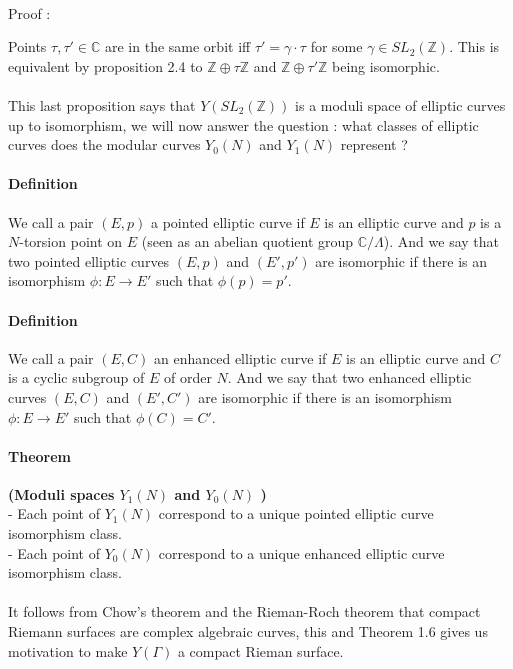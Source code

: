 \documentclass[letterpaper,10pt]{article}
\begin{document}
{\itshape \paragraph{}Proof : } Points $\tau, \tau' \in \mathbb{C}$ are in the same orbit iff $\tau' = \gamma \cdot \tau$ for some $\gamma \in SL_2(\mathbb{Z})$.
This is equivalent by proposition  2.4 to $\mathbb{Z} \oplus \tau\mathbb{Z}$ and $\mathbb{Z} \oplus \tau'\mathbb{Z}$ being isomorphic.



{\itshape \paragraph{} This last proposition says that $Y(SL_2(\mathbb{Z}))$ is a moduli space of elliptic curves up to isomorphism, we will now answer the question :
what classes of elliptic curves does the modular curves $Y_0(N)$ and $Y_1(N)$ represent ?  } 

\paragraph{Definition } We call a pair $(E,p)$ a pointed elliptic curve if $E$ is an elliptic curve and $p$ is a $N$-torsion point on $E$ 
(seen as an abelian quotient group $\mathbb{C}/ \Lambda$). And we say that two pointed elliptic curves $(E,p)$ and $(E',p')$ are isomorphic if there is an isomorphism
$\phi: E\to E'$ such that $\phi(p) = p'$.

\paragraph{Definition } We call a pair $(E,C)$ an enhanced elliptic curve if $E$ is an elliptic curve and $C$ is a cyclic subgroup of $E$ of order $N$. 
And we say that two enhanced elliptic curves $(E,C)$ and $(E',C')$ are isomorphic if there is an isomorphism
$\phi: E\to E'$ such that $\phi(C) = C'$.

\paragraph{Theorem }\textbf{(Moduli spaces $Y_1(N)$ and $Y_0(N)$ )} \\- Each point of $Y_1(N)$ correspond to a unique pointed elliptic curve isomorphism class.\\
 - Each point of $Y_0(N)$ correspond to a unique enhanced elliptic curve isomorphism class.

 {\itshape \paragraph{} It follows from Chow's theorem and the Rieman-Roch theorem that compact Riemann surfaces are complex algebraic curves,
  this and Theorem 1.6 gives us motivation to make $Y(\Gamma) $ a compact Rieman surface. }
\end{document}
